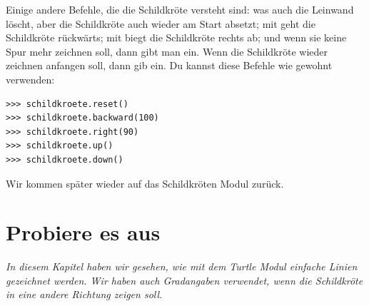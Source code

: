 Einige andere Befehle, die die Schildkröte versteht sind:  was auch die Leinwand löscht, aber die Schildkröte auch wieder am Start absetzt; mit  geht die Schildkröte rückwärts; mit  biegt die Schildkröte rechts ab; und wenn sie keine Spur mehr zeichnen soll, dann gibt man  ein. Wenn die Schildkröte wieder zeichnen anfangen soll, dann gib  ein. Du kannst diese Befehle wie gewohnt verwenden:

\begin{Verbatim}[frame=single]
>>> schildkroete.reset()
>>> schildkroete.backward(100)
>>> schildkroete.right(90)
>>> schildkroete.up()
>>> schildkroete.down()
\end{Verbatim}

\noindent
Wir kommen später wieder auf das Schildkröten Modul zurück.

\section{Probiere es aus}

\emph{In diesem Kapitel haben wir gesehen, wie mit dem Turtle Modul einfache Linien gezeichnet werden. Wir haben auch Gradangaben verwendet, wenn die Schildkröte in eine andere Richtung zeigen soll.}

